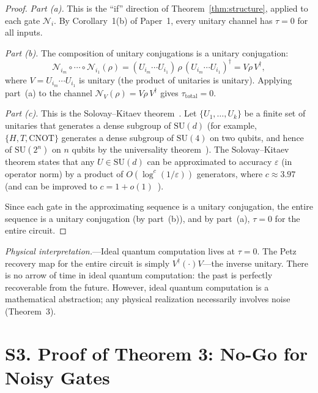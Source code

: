 \documentclass[prl,twocolumn,superscriptaddress,longbibliography]{revtex4-2}
\newcommand{\chan}{\mathcal{N}}
\newcommand{\tauasym}{\tau}
\begin{document}
\begin{proof}
\emph{Part (a).}
This is the ``if'' direction of Theorem~\ref{thm:structure},
applied to each gate $\chan_i$.  By Corollary~1(b) of Paper~1,
every unitary channel has $\tauasym = 0$ for all inputs.

\emph{Part (b).}
The composition of unitary conjugations is a unitary conjugation:
\begin{equation}
\chan_{i_m} \circ \cdots \circ \chan_{i_1}(\rho)
= (U_{i_m} \cdots U_{i_1})\,\rho\,(U_{i_m} \cdots U_{i_1})^\dagger
= V\rho\, V^\dagger,
\end{equation}
where $V = U_{i_m} \cdots U_{i_1}$ is unitary (the product of
unitaries is unitary).  Applying part~(a) to the channel
$\chan_V(\rho) = V\rho\, V^\dagger$ gives
$\tauasym_{\mathrm{total}} = 0$.

\emph{Part (c).}
This is the Solovay--Kitaev theorem~\cite{Kitaev1997,DawsonNielsen2006}.
Let $\{U_1, \ldots, U_k\}$ be a finite set of unitaries that
generates a dense subgroup of $\mathrm{SU}(d)$ (for example,
$\{H, T, \mathrm{CNOT}\}$ generates a dense subgroup of
$\mathrm{SU}(4)$ on two qubits, and hence of $\mathrm{SU}(2^n)$
on $n$ qubits by the universality theorem~\cite{Kitaev1997}).
The Solovay--Kitaev theorem states that any $U \in \mathrm{SU}(d)$
can be approximated to accuracy $\varepsilon$ (in operator norm)
by a product of $O(\log^c(1/\varepsilon))$ generators, where
$c \approx 3.97$ (and can be improved to
$c = 1 + o(1)$~\cite{DawsonNielsen2006}).

Since each gate in the approximating sequence is a unitary conjugation,
the entire sequence is a unitary conjugation (by part~(b)), and by
part~(a), $\tauasym = 0$ for the entire circuit.
\end{proof}

\emph{Physical interpretation.}---Ideal quantum computation lives
at $\tauasym = 0$.  The Petz recovery map for the entire circuit is
simply $V^\dagger(\cdot)V$---the inverse unitary.  There is no arrow
of time in ideal quantum computation: the past is perfectly recoverable
from the future.  However, ideal quantum computation is a mathematical
abstraction; any physical realization necessarily involves noise
(Theorem~3).

\section{S3. Proof of Theorem 3: No-Go for Noisy Gates}
\label{sec:thm3}
\end{document}
